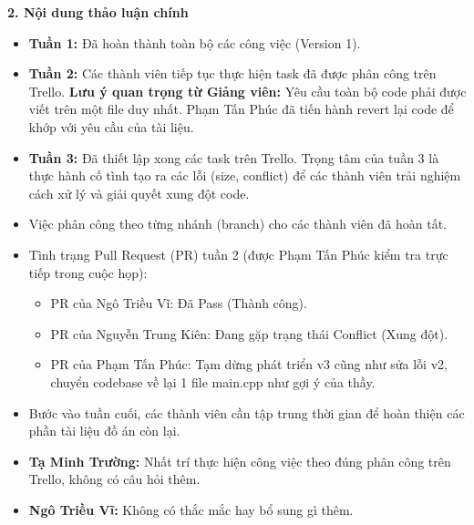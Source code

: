 \documentclass[12pt,a4paper]{article}
\begin{document}
\vspace{4pt}
\textbf{2. Nội dung thảo luận chính}

\begin{itemize}
    \item \textbf{Tuần 1:} Đã hoàn thành toàn bộ các công việc (Version 1).
    \item \textbf{Tuần 2:} Các thành viên tiếp tục thực hiện task đã được phân công trên Trello. \textbf{Lưu ý quan trọng từ Giảng viên:} Yêu cầu toàn bộ code phải được viết trên một file duy nhất. Phạm Tấn Phúc đã tiến hành revert lại code để khớp với yêu cầu của tài liệu.
    \item \textbf{Tuần 3:} Đã thiết lập xong các task trên Trello. Trọng tâm của tuần 3 là thực hành cố tình tạo ra các lỗi (size, conflict) để các thành viên trải nghiệm cách xử lý và giải quyết xung đột code.
\end{itemize}

\begin{itemize}
    \item Việc phân công theo từng nhánh (branch) cho các thành viên đã hoàn tất.
    \item Tình trạng Pull Request (PR) tuần 2 (được Phạm Tấn Phúc kiểm tra trực tiếp trong cuộc họp):
    \begin{itemize}
        \item PR của Ngô Triều Vĩ: Đã Pass (Thành công).
        \item PR của Nguyễn Trung Kiên: Đang gặp trạng thái Conflict (Xung đột).
        \item PR của Phạm Tấn Phúc: Tạm dừng phát triển v3 cũng như sửa lỗi v2, chuyển codebase về lại 1 file main.cpp như gợi ý của thầy.
    \end{itemize}
\end{itemize}

\begin{itemize}
    \item Bước vào tuần cuối, các thành viên cần tập trung thời gian để hoàn thiện các phần tài liệu đồ án còn lại.
\end{itemize}

\begin{itemize}
    \item \textbf{Tạ Minh Trường:} Nhất trí thực hiện công việc theo đúng phân công trên Trello, không có câu hỏi thêm.
    \item \textbf{Ngô Triều Vĩ:} Không có thắc mắc hay bổ sung gì thêm.
\end{itemize}
\end{document}
